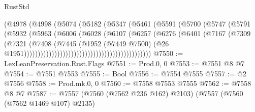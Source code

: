 \begin{lexlean}{RustStd}
\begin{coremodule}
{\begin{coremodule}
{{{{{{{{{{{{{{{{{{{{{{{{{{{{{{{{{{                                              (@4978
                                                (@4998
                                                  (@5074
                                                    (@5182
                                                      (@5347
                                                        (@5461
                                                          (@5591
                                                            (@5700
                                                              (@5747
                                                                (@5791
                                                                  (@5932
                                                                    (@5963
                                                                      (@6006
                                                                        (@6028
                                                                          (@6107
                                                                            (@6257
                                                                              (@6276
                                                                                (@6401
                                                                                  (@7167
                                                                                    (@7309
                                                                                      (@7321
                                                                                        (@7408
                                                                                          (@7445
                                                                                            (@1952
                                                                                              (@7449
                                                                                                @7500)
                                                                                              (@26
                                                                                                @1951))))))))))))))))))))))))))))))))))))))))))))))
@7550 := LexLeanPreservation.Rust.Flags
@7551 := Prod.{0, 0}
@7553 := @7551 @8 @7
@7554 := @7551 @7553
@7555 := Bool
@7556 := @7554 @7555
@7557 := @2 @7556
@7558 := Prod.mk.{0, 0}
@7560 := @7558 @7553 @7555
@7562 := @7558 @8 @7
@7587 := @7557
    (@7560 (@7562 @236 @162) @2103)
    (@7557
      (@7560 (@7562 @1469 @107) @2135)
}}}}}}}}}}}}}}}}}}}}}}}}}}}}}}}}}}
\end{coremodule}}
\end{coremodule}
\end{lexlean}
